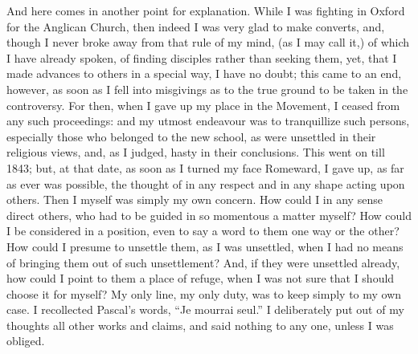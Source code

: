 And here comes in another point for explanation. While I was fighting
in Oxford for the Anglican Church, then indeed I was
very glad to make converts, and, though I never broke away from that
rule of my mind, (as I may call it,) of which I have already spoken, of
finding disciples rather than seeking them, yet, that I made advances to
others in a special way, I have no doubt; this came to an end, however,
as soon as I fell into misgivings as to the true ground to be taken in
the controversy. For then, when I gave up my place in the
Movement, I ceased from any such proceedings: and my utmost
endeavour was to tranquillize such persons, especially those who
belonged to the new school, as were unsettled in their religious views,
and, as I judged, hasty in their conclusions. This went on till 1843;
but, at that date, as soon as I turned my face Romeward, I gave up, as far as ever was possible, the thought
of in any respect and in any shape acting upon others. Then I
myself was simply my own concern. How could I in any sense direct
others, who had to be guided in so momentous a matter myself? How could
I be considered in a position, even to say a word to them one way or the
other? How could I presume to unsettle them, as I was unsettled, when I
had no means of bringing them out of such unsettlement? And, if they
were unsettled already, how could I point to them a place of refuge,
when I was not sure that I should choose it for myself? My only
line, my only duty, was to keep simply to my own case. I recollected
Pascal's words, ``Je mourrai seul.'' I deliberately put out of
my thoughts all other works and claims, and said nothing to any one,
unless I was obliged.


